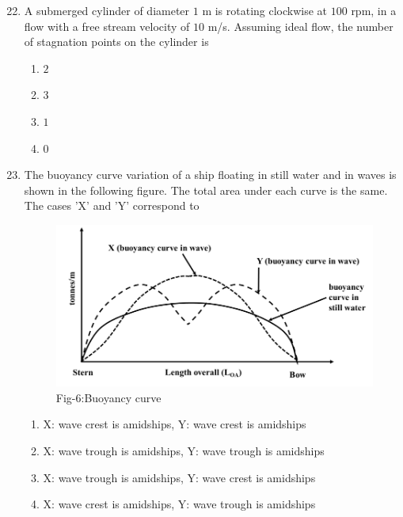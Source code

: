 \documentclass[journal]{IEEEtran}
\theoremstyle{remark}
\begin{document}
\begin{enumerate}[itemsep=1em]
\setcounter{enumi}{21}
\item  A submerged cylinder of diameter $1$ m is rotating clockwise at $100$ rpm, in a flow with a free stream velocity of $10$ m/s. Assuming ideal flow, the number of stagnation points on the cylinder is 
\begin{multicols}{4}
\begin{enumerate}
      \item $2$
      \item $3$
      \item $1$
      \item $0$
\end{enumerate}
\end{multicols}
\end{enumerate}

\newpage
\vspace*{0.25cm}

\begin{enumerate}[itemsep=1em]
\setcounter{enumi}{22}
\item The buoyancy curve variation of a ship floating in still water and in waves is shown in the following figure. The total area under each curve is the same. The cases 'X' and 'Y' correspond to 

\begin{figure}[H]
    \centering
    \includegraphics[width=0.6\columnwidth]{figs/fig-6.jpeg}
    \caption*{Fig-6:Buoyancy curve}
    \label{fig-6}
\end{figure}

\begin{enumerate}[leftmargin=2.5em, labelsep=0.5em, itemsep=0.5em]
    \item X: wave crest is amidships, Y: wave crest is amidships 
    \item X: wave trough is amidships, Y: wave trough is amidships 
    \item X: wave trough is amidships, Y: wave crest is amidships  
    \item X: wave crest is amidships, Y: wave trough is amidships
\end{enumerate}

\end{enumerate}
\end{document}
